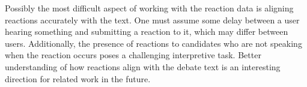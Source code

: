 
Possibly the most difficult aspect of working with the reaction data is aligning reactions accurately with the text. One must assume some delay between a user hearing something and submitting a reaction to it, which may differ between users. Additionally, the presence of reactions to candidates who are not speaking when the reaction occurs poses a challenging interpretive task. Better understanding of how reactions align with the debate text is an interesting direction for related work in the future.